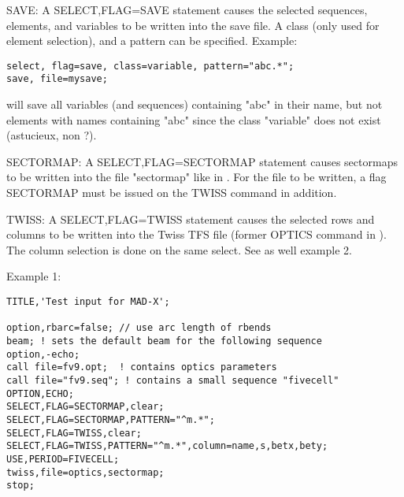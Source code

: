SAVE: A SELECT,FLAG=SAVE statement causes the
selected sequences, elements, and variables to be written into the save
file. A class (only used for element selection), and a pattern can be
specified. Example:  
\begin{verbatim}
select, flag=save, class=variable, pattern="abc.*";
save, file=mysave;
\end{verbatim} 
will save all variables (and sequences) containing "abc" in their name,
but not elements with names containing "abc" since the class "variable"
does not exist (astucieux, non ?).  

SECTORMAP: A SELECT,FLAG=SECTORMAP statement causes sectormaps to be
written into the file "sectormap" like in \madeight. For the file to be
written, a flag SECTORMAP must be issued on the TWISS command in
addition.  

TWISS: A SELECT,FLAG=TWISS statement causes the selected rows and
columns to be written into the Twiss TFS file (former OPTICS command in
\madeight). The column selection is done on the same select. See as well
example 2.  

Example 1:  
\begin{verbatim}
TITLE,'Test input for MAD-X';

option,rbarc=false; // use arc length of rbends
beam; ! sets the default beam for the following sequence
option,-echo;
call file=fv9.opt;  ! contains optics parameters
call file="fv9.seq"; ! contains a small sequence "fivecell"
OPTION,ECHO;
SELECT,FLAG=SECTORMAP,clear;
SELECT,FLAG=SECTORMAP,PATTERN="^m.*";
SELECT,FLAG=TWISS,clear;
SELECT,FLAG=TWISS,PATTERN="^m.*",column=name,s,betx,bety;
USE,PERIOD=FIVECELL;
twiss,file=optics,sectormap;
stop;
\end{verbatim} 

